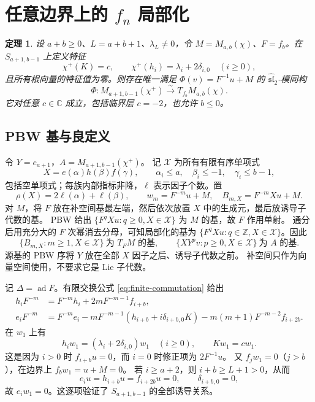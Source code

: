 \documentclass[UTF8,11pt]{ctexart}
\newcommand{\C}{\mathbb C}
\newcommand{\Z}{\mathbb Z}
\newcommand{\g}{\widehat{\mathfrak{sl}}_2}
\newcommand{\ad}{\operatorname{ad}}
\newtheorem{theorem}{定理}[section]
\theoremstyle{definition}
\begin{document}
\section{任意边界上的 \texorpdfstring{\(f_n\)}{f-n} 局部化}

\begin{theorem}\label{thm:boundary}
设 \(a+b\ge0\)、\(L=a+b+1\)、\(\lambda_L\ne0\)，令
\(M=M_{a,b}(\chi)\)、\(F=f_b\)。在 \(S_{a+1,b-1}\) 上定义特征
\[
 \chi^+(K)=c,\qquad \chi^+(h_i)=\lambda_i+2\delta_{i,0}\quad(i\ge0),
\]
且所有根向量的特征值为零。则存在唯一满足 \(\Phi(v)=F^{-1}u+M\) 的 \(\g\)-模同构
\begin{equation}\label{eq:boundary-iso}
 \Phi:M_{a+1,b-1}(\chi^+)\xrightarrow{\sim}T_{f_b}M_{a,b}(\chi).
\end{equation}
它对任意 \(c\in\C\) 成立，包括临界层 \(c=-2\)，也允许 \(b\le0\)。
\end{theorem}

\subsection{PBW 基与良定义}

令 \(Y=e_{a+1}\)，\(A=M_{a+1,b-1}(\chi^+)\)。
记 \(\mathcal X\) 为所有有限有序单项式
\[
 X=e(\alpha)h(\beta)f(\gamma),\qquad
 \alpha_i\le a,\quad\beta_i\le-1,\quad\gamma_i\le b-1,
\]
包括空单项式；每族内部指标非降，\(\ell\) 表示因子个数。置
\[
 \rho(X)=2\ell(\alpha)+\ell(\beta),\qquad
 w_m=F^{-m}u+M,\quad B_{m,X}=F^{-m}Xu+M.
\]
对 \(M\)，将 \(F\) 放在补空间基最左端，然后依次放置 \(X\) 中的生成元，最后放诱导子代数的基。
PBW 给出 \(\{F^qXu:q\ge0,X\in\mathcal X\}\) 为 \(M\) 的基，故 \(F\) 作用单射。
通分后用充分大的 \(F\) 次幂消去分母，可知局部化的基为
\(\{F^qXu:q\in\Z,X\in\mathcal X\}\)。因此
\begin{equation}\label{eq:pbw-bases}
 \{B_{m,X}:m\ge1,X\in\mathcal X\}\ \text{为 }T_FM\text{ 的基},\qquad
 \{XY^pv:p\ge0,X\in\mathcal X\}\ \text{为 }A\text{ 的基}.
\end{equation}
源基的 PBW 序将 \(Y\) 放在全部 \(X\) 因子之后、诱导子代数之前。
补空间只作为向量空间使用，不要求它是 Lie 子代数。

记 \(\Delta=\ad F\)。有限交换公式 \eqref{eq:finite-commutation} 给出
\[
\begin{aligned}
 h_iF^{-m}&=F^{-m}h_i+2mF^{-m-1}f_{i+b},\\
 e_iF^{-m}&=F^{-m}e_i-mF^{-m-1}(h_{i+b}+i\delta_{i+b,0}K)
             -m(m+1)F^{-m-2}f_{i+2b}.
\end{aligned}
\]
在 \(w_1\) 上有
\[
 h_iw_1=(\lambda_i+2\delta_{i,0})w_1\quad(i\ge0),\qquad Kw_1=cw_1.
\]
这是因为 \(i>0\) 时 \(f_{i+b}u=0\)，而 \(i=0\) 时修正项为 \(2F^{-1}u\)。
又 \(f_jw_1=0\)（\(j>b\)），在边界上 \(f_bw_1=u+M=0\)。
若 \(i\ge a+2\)，则 \(i+b\ge L+1>0\)，从而
\[
 e_iu=h_{i+b}u=f_{i+2b}u=0,\qquad \delta_{i+b,0}=0,
\]
故 \(e_iw_1=0\)。这逐项验证了 \(S_{a+1,b-1}\) 的全部诱导关系。
\end{document}

